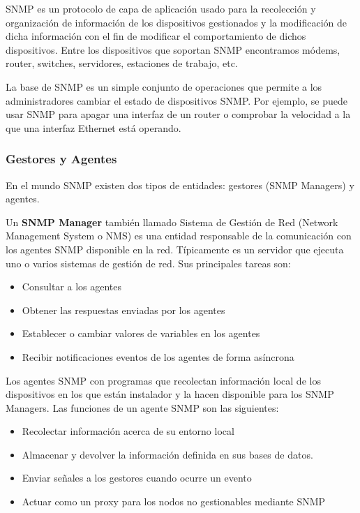 \gls{SNMP} es un protocolo de capa de aplicación usado para la recolección y organización de
información de los dispositivos gestionados y la modificación de dicha información con el fin de 
modificar el comportamiento de dichos dispositivos. Entre los dispositivos que soportan SNMP 
encontramos módems, router, switches, servidores, estaciones de trabajo, etc.

La base de \gls{SNMP} es un simple conjunto de operaciones que permite a los administradores cambiar el
estado de dispositivos SNMP. Por ejemplo, se puede usar \gls{SNMP} para apagar una interfaz de un router o
comprobar la velocidad a la que una interfaz Ethernet está operando. 

\subsubsection{Gestores y Agentes}

En el mundo \gls{SNMP} existen dos tipos de entidades: gestores (\gls{SNMP} Managers) y agentes. 

Un \textbf{SNMP Manager} también llamado Sistema de Gestión de Red (Network Management System o NMS)
es una entidad responsable de la comunicación con los agentes SNMP disponible en la red. Típicamente
es un servidor que ejecuta uno o varios sistemas de gestión de red. Sus principales tareas son:

\begin{itemize}
    \item Consultar a los agentes
    \item Obtener las respuestas enviadas por los agentes
    \item Establecer o cambiar valores de variables en los agentes
    \item Recibir notificaciones eventos de los agentes de forma asíncrona
\end{itemize}

Los agentes SNMP con programas que recolectan información local de los dispositivos en los que están
instalador y la hacen disponible para los SNMP Managers. Las funciones de un agente SNMP son las
siguientes:

\begin{itemize}
    \item Recolectar información acerca de su entorno local
    \item Almacenar y devolver la información definida en sus bases de datos.
    \item Enviar señales a los gestores cuando ocurre un evento
    \item Actuar como un proxy para los nodos no gestionables mediante SNMP
\end{itemize}

